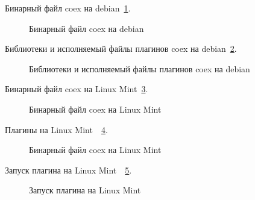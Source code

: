 Бинарный файл coex на debian~\ref{debian:debian}.

\begin{figure}[h!]
\caption{ Бинарный файл coex на debian}
\label{debian:debian}
\end{figure}

Библиотеки и исполняемый файлы плагинов coex на debian~\ref{debian2:debian2}.

\begin{figure}[h!]
\caption{ Библиотеки и исполняемый файлы плагинов coex на debian}
\label{debian2:debian2}
\end{figure}

Бинарный файл coex на Linux Mint~\ref{Linux Mint:Linux Mint}.

\begin{figure}[h!]
\caption{ Бинарный файл coex на Linux Mint}
\label{Linux Mint:Linux Mint}
\end{figure}

Плагины на Linux Mint~~\ref{Plugins:Plugins}.

\begin{figure}[h!]
\caption{ Бинарный файл coex на Linux Mint}
\label{Plugins:Plugins}
\end{figure}

Запуск плагина на Linux Mint~~\ref{Zapusk:Zapusk}.

\begin{figure}[h!]
\caption{ Запуск плагина на Linux Mint}
\label{Zapusk:Zapusk}
\end{figure}

\cite{deb_package_howto} 
\cite{deb_man} 

\clearpage











